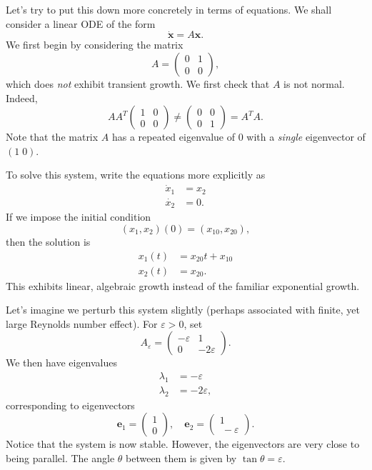 \documentclass[a4paper]{article}
\begin{document}
Let's try to put this down more concretely in terms of equations. We shall consider a linear ODE of the form
\[
  \dot{\mathbf{x}} = A \mathbf{x}.
\]
We first begin by considering the matrix
\[
  A =
  \begin{pmatrix}
    0 & 1\\
    0 & 0
  \end{pmatrix},
\]
which does \emph{not} exhibit transient growth. We first check that $A$ is not normal. Indeed,
\[
  AA^T
  \begin{pmatrix}
    1 & 0\\
    0 & 0
  \end{pmatrix} \not=
  \begin{pmatrix}
    0 & 0\\
    0 & 1
  \end{pmatrix} = A^T A.
\]
Note that the matrix $A$ has a repeated eigenvalue of $0$ with a \emph{single} eigenvector of $(1\; 0)$.

To solve this system, write the equations more explicitly as
\begin{align*}
  \dot{x}_1 &= x_2\\
  \dot{x_2} &= 0.
\end{align*}
If we impose the initial condition
\[
  (x_1, x_2)(0) = (x_{10}, x_{20}),
\]
then the solution is
\begin{align*}
  x_1(t) &= x_{20}t + x_{10}\\
  x_2(t) &= x_{20}.
\end{align*}
This exhibits linear, algebraic growth instead of the familiar exponential growth.

Let's imagine we perturb this system slightly (perhaps associated with finite, yet large Reynolds number effect). For $\varepsilon > 0$, set
\[
  A_\varepsilon =
  \begin{pmatrix}
    -\varepsilon & 1\\
    0 & -2\varepsilon
  \end{pmatrix}.
\]
We then have eigenvalues
\begin{align*}
  \lambda_1 &= -\varepsilon\\
  \lambda_2 &= -2\varepsilon,
\end{align*}
corresponding to eigenvectors
\[
  \mathbf{e}_1 =
  \begin{pmatrix}
    1 \\0
  \end{pmatrix},\quad \mathbf{e}_2 =
  \begin{pmatrix}
    1 \\\ -\varepsilon
  \end{pmatrix}.
\]
Notice that the system is now stable. However, the eigenvectors are very close to being parallel. The angle $\theta$ between them is given by $\tan \theta = \varepsilon$.
\end{document}
